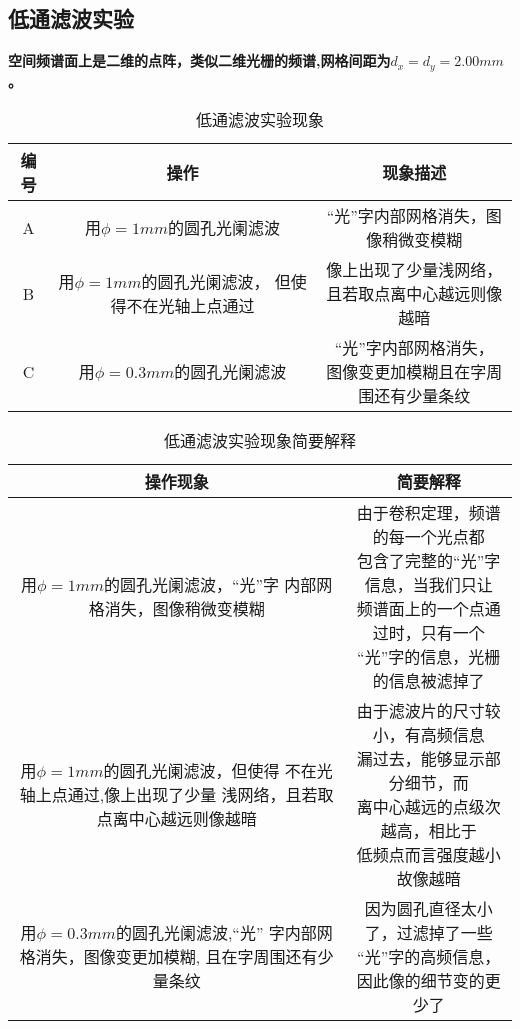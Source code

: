 \documentclass[UTF8]{ctexart}
\begin{document}
\subsection{低通滤波实验}
\par \textbf{空间频谱面上是二维的点阵，类似二维光栅的频谱,网格间距为$d_{x}=d_{y}=2.00mm$。
}
	\begin{table}[H]
	\centering
	\begin{tabular}{|c|c|c|}
		\toprule[0.5mm]
		编号&操作&现象描述\\
		\midrule
		A&用$\phi=1mm$的圆孔光阑滤波&“光”字内部网格消失，图像稍微变模糊\\
		\midrule
		B&\tablecell{c}{用$\phi=1mm$的圆孔光阑滤波，\\但使得不在光轴上点通过}&\tablecell{c}{像上出现了少量浅网络，\\且若取点离中心越远则像越暗}\\
		\midrule
		C&用$\phi=0.3mm$的圆孔光阑滤波&\tablecell{c}{“光”字内部网格消失，\\图像变更加模糊且在字周围还有少量条纹}\\
		\bottomrule[0.5mm]
	\end{tabular}
	\caption{低通滤波实验现象}
\end{table}
\begin{table}[H]
	\centering
	\begin{tabular}{|c|c|}
		\toprule[0.5mm]
		操作现象&简要解释\\
		\midrule
		\tablecell{c}{
			用$\phi=1mm$的圆孔光阑滤波，“光”字\\内部网格消失，图像稍微变模糊}
		&\tablecell{c}{
			由于卷积定理，频谱的每一个光点都\\包含了完整的“光”字信息，当我们只让\\频谱面上的一个点通过时，只有一个\\“光”字的信息，光栅的信息被滤掉了}\\
		\midrule
		\tablecell{c}{
			用$\phi=1mm$的圆孔光阑滤波，但使得\\不在光轴上点通过,像上出现了少量\\浅网络，且若取点离中心越远则像越暗}&\tablecell{c}{
			由于滤波片的尺寸较小，有高频信息\\漏过去，能够显示部分细节，而\\离中心越远的点级次越高，相比于\\低频点而言强度越小故像越暗}\\
		\midrule
		\tablecell{c}{用$\phi=0.3mm$的圆孔光阑滤波,“光”\\字内部网格消失，图像变更加模糊,\\且在字周围还有少量条纹}&\tablecell{c}{因为圆孔直径太小了，过滤掉了一些\\“光”字的高频信息，因此像的细节变的更少了}\\
		\bottomrule[0.5mm]
	\end{tabular}
\caption{低通滤波实验现象简要解释}
\end{table}
\end{document}
